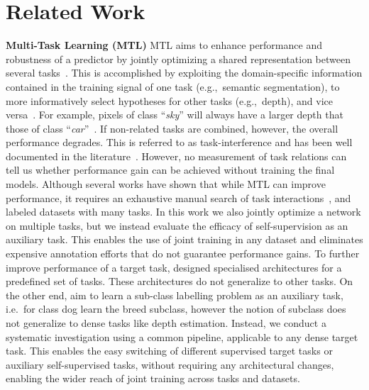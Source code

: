 \documentclass[10pt,twocolumn,letterpaper]{article}
\newcommand{\parsection}[1]{\vspace{1mm}\noindent\textbf{#1 }}
\begin{document}
 \section{Related Work}
\parsection{Multi-Task Learning (MTL)}
MTL aims to enhance performance and robustness of a predictor by jointly optimizing a shared representation between several tasks~\cite{caruana1997multitask}.
This is accomplished by exploiting the domain-specific information contained in the training signal of one task (e.g.,\ semantic segmentation), to more informatively select hypotheses for other tasks (e.g.,\ depth), and vice versa~\cite{ranjan2017hyperface,bruggemann2021exploring}. 
For example, pixels of class ``\emph{sky}'' will always have a larger depth that those of class ``\emph{car}''~\cite{saha2021learning}.
If non-related tasks are combined, however, the overall performance degrades.
This is referred to as task-interference and has been well documented in the literature~\cite{maninis2019attentive,kanakis2020reparameterizing}. 
However, no measurement of task relations can tell us whether performance gain can be achieved without training the final models.
Although several works have shown that while MTL can improve performance, it requires an exhaustive manual search of task interactions~\cite{standley2020tasks}, and labeled datasets with many tasks. 
In this work we also jointly optimize a network on multiple tasks, but we instead evaluate the efficacy of self-supervision as an auxiliary task. 
This enables the use of joint training in any dataset and eliminates expensive annotation efforts that do not guarantee performance gains.
To further improve performance of a target task, \cite{hoyer2021three,guizilini2020robust,baek2022semi,georgescu2021anomaly} designed specialised architectures for a predefined set of tasks. 
These architectures do not generalize to other tasks.
On the other end, \cite{liu2019self} aim to learn a sub-class labelling problem as an auxiliary task, i.e.\ for class dog learn the breed subclass, however the notion of subclass does not generalize to dense tasks like depth estimation.
Instead, we conduct a systematic investigation using a common pipeline, applicable to any dense target task.
This enables the easy switching of different supervised target tasks or auxiliary self-supervised tasks, without requiring any architectural changes, enabling the wider reach of joint training across tasks and datasets.
\end{document}

